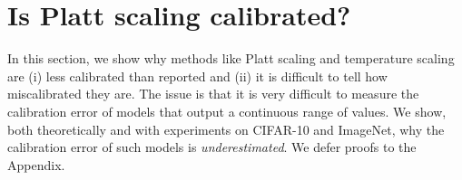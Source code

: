 \section{Is Platt scaling calibrated?}
\label{sec:challenges-measuring}


In this section, we show why methods like Platt scaling and temperature scaling are (i) less calibrated than reported and (ii) it is difficult to tell how miscalibrated they are. The issue is that it is very difficult to measure the calibration error of models that output a continuous range of values. We show, both theoretically and with experiments on CIFAR-10 and ImageNet, why the calibration error of such models is \emph{underestimated}. We defer proofs to the Appendix.





